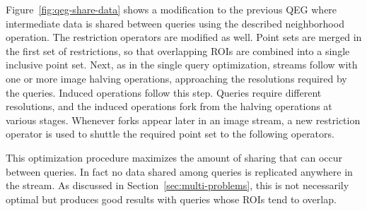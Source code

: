\documentclass{ucdthesis}       %
\begin{document}
Figure~\ref{fig:qeg-share-data} shows a modification to the previous
\ac{QEG} where intermediate data is shared between queries using the
described neighborhood operation.  The restriction operators are
modified as well.  Point sets are merged in the first set of
restrictions, so that overlapping \acp{ROI} are combined into a single
inclusive point set.  Next, as in the single query optimization,
streams follow with one or more image halving operations, approaching
the resolutions required by the queries.  Induced operations follow
this step.  Queries require different resolutions, and the induced
operations fork from the halving operations at various stages.
Whenever forks appear later in an image stream, a new restriction
operator is used to shuttle the required point set to the
following operators.

This optimization procedure maximizes the amount of sharing that can
occur between queries.  In fact no data shared among queries is
replicated anywhere in the stream.  As discussed in
Section~\ref{sec:multi-problems}, this is not necessarily optimal but
produces good results with queries whose \acp{ROI} tend to overlap.
\end{document}

